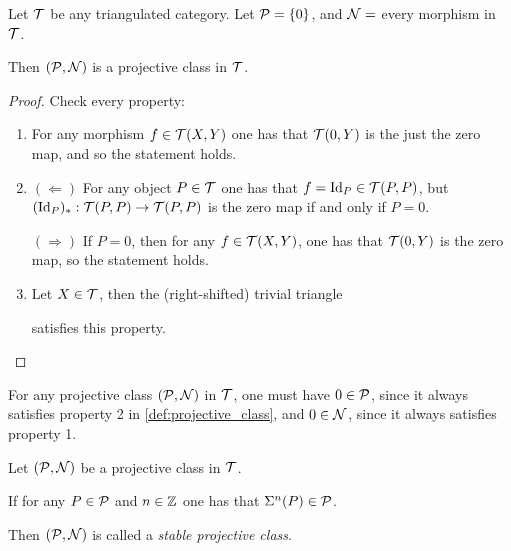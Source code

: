 \begin{example}
    Let \( {\mathcal{T}} \) be any triangulated category. Let \( {\mathcal{P}} = \left\{ 0 \right\} \), and \( {\mathcal{N}} = \) every morphism in \( {\mathcal{T}} \).

    Then \( ({\mathcal{P}}, {\mathcal{N}}) \) is a projective class in \( {\mathcal{T}} \).
\end{example}
\begin{proof}
    Check every property:
    \begin{enumerate}
        \item {
            For any morphism \( f \in {\mathcal{T}}(X, Y) \) one has that \( {\mathcal{T}}(0, Y) \) is the just the zero map, and so the statement holds.
        }
        \item {
            \( (\Leftarrow) \) For any object \( P \in {\mathcal{T}} \) one has that \( f = \operatorname{Id}_P \in {\mathcal{T}}(P, P) \), but \( (\operatorname{Id}_P)_*: {\mathcal{T}}(P, P) \to {\mathcal{T}}(P, P) \) is the zero map if and only if \( P = 0 \).

            \( (\Rightarrow) \) If \( P = 0 \), then for any \( f \in {\mathcal{T}}(X, Y) \), one has that \( {\mathcal{T}}(0, Y) \) is the zero map, so the statement holds. 
        }
        \item {
            Let \( X \in {\mathcal{T}} \), then the (right-shifted) trivial triangle
            \begin{center}
            \end{center}
            satisfies this property.
        }
    \end{enumerate}
\end{proof}

\begin{remark}
    For any projective class \( ( {\mathcal{P}}, {\mathcal{N}} ) \) in \( {\mathcal{T}} \), one must have \( 0 \in {\mathcal{P}} \), since it always satisfies property 2 in \autoref{def:projective_class}, and \( 0 \in {\mathcal{N}} \), since it always satisfies property 1.
\end{remark}

\begin{definition}
    Let \( ({\mathcal{P}}, {\mathcal{N}}) \) be a projective class in \( {\mathcal{T}} \).

    If for any \( P \in {\mathcal{P}} \) and \( n \in {\mathbb{Z}} \) one has that \( \Sigma^n(P) \in {\mathcal{P}} \).
    
    Then \( ({\mathcal{P}}, {\mathcal{N}}) \) is called a \emph{stable projective class}.
\end{definition}

